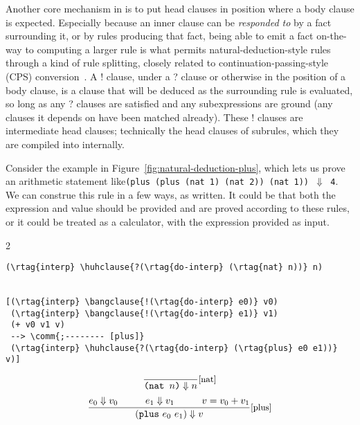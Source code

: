 Another core mechanism in \slog{} is to put head clauses in position where a body clause is expected.
%
Especially because an inner clause can be \emph{responded to} by a fact surrounding it, or by rules producing that fact,
being able to emit a fact on-the-way to computing a larger rule is what permits natural-deduction-style rules through a kind of rule
splitting, closely related to continuation-passing-style (CPS) conversion~\cite{appel2007compiling}.
A ! clause, under a ? clause or otherwise in the position of a body clause,
is a clause that will be deduced as the surrounding rule is evaluated, so long as any ? clauses are satisfied and any subexpressions
are ground (any clauses it depends on have been matched already). These ! clauses are intermediate head clauses; technically the head clauses of subrules, which they are compiled into internally. 

Consider the example in Figure~\ref{fig:natural-deduction-plus}, which lets us prove an arithmetic statement like\newline\texttt{(plus (plus (nat 1) (nat 2)) (nat 1)) $\Downarrow$ 4}.
We can construe this rule in a few ways, as written. It could be that both the expression and value should be provided and are proved according to these rules, or it could be treated as a calculator, with the expression provided as input.

\vspace{-0.4cm}
\begin{figure*}[h]
\begin{multicols}{2}
\begin{Verbatim}[baselinestretch=0.75,commandchars=\\\{\}]
(\rtag{interp} \huhclause{?(\rtag{do-interp} (\rtag{nat} n))} n)

  
[(\rtag{interp} \bangclause{!(\rtag{do-interp} e0)} v0)
 (\rtag{interp} \bangclause{!(\rtag{do-interp} e1)} v1)
 (+ v0 v1 v) 
 --> \comm{;-------- [plus]}
 (\rtag{interp} \huhclause{?(\rtag{do-interp} (\rtag{plus} e0 e1))} v)]
\end{Verbatim}
\columnbreak
\[
  \frac{\ }{\texttt{(nat $n$)} \Downarrow n}\text{\small[nat]}
\]
  \vspace{0.75cm}
\[
 \frac{e_0 \Downarrow v_0 \hspace{1cm} e_1 \Downarrow v_1 \hspace{1cm} v=v_0+v_1}{(\texttt{plus}\ e_0\ e_1) \Downarrow v} \text{\small[plus]}
\]
\end{multicols}
\caption{Natural-deduction-style reasoning with ! clauses in \slog{}.}
\label{fig:natural-deduction-plus}
\end{figure*}
\vspace{-0.4cm}

